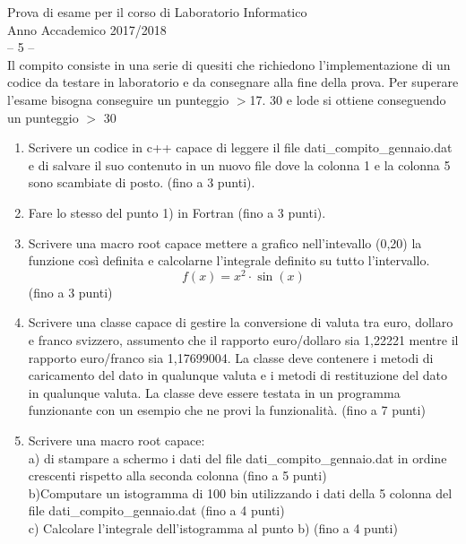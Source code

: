 \documentclass[11pt,fleqn]{book} %
\begin{document}
\newpage
\thispagestyle{empty}
{
\Large\centering
Prova di esame per il corso di Laboratorio Informatico\\		
Anno Accademico 2017/2018\\
-- 5 --\\
}
{
\small\centering
Il compito consiste in una serie di quesiti che richiedono l’implementazione di un codice da testare in laboratorio e da consegnare alla fine della prova. Per superare l’esame bisogna conseguire un punteggio $>$17.  
30 e lode si ottiene conseguendo un punteggio $>$ 30
}

\begin{enumerate}


\item Scrivere un codice in c++ capace di leggere il file dati\_compito\_gennaio.dat e di salvare il suo contenuto in un nuovo file dove la colonna 1 e la colonna 5 sono scambiate di posto. (fino a 3 punti).

\item Fare lo stesso del punto 1) in Fortran (fino a 3 punti).


\item Scrivere una macro root capace mettere a grafico nell'intevallo (0,20)
la funzione così definita e calcolarne l'integrale definito su tutto l'intervallo.
$$
f(x) = x^2\cdot\sin(x)
$$
 (fino a 3  punti)

\item Scrivere una classe capace di gestire la conversione di valuta tra euro, dollaro e franco svizzero, assumento che il rapporto euro/dollaro sia 1,22221 mentre il rapporto euro/franco sia 1,17699004. La classe deve contenere i metodi di caricamento del dato in qualunque valuta e i metodi di restituzione del dato in qualunque valuta. La classe deve essere testata in un programma funzionante con un esempio che ne provi la funzionalità. (fino a 7 punti)  

\item Scrivere una macro root capace:\\
     a) di stampare a schermo i dati del file dati\_compito\_gennaio.dat in ordine crescenti rispetto alla seconda colonna (fino a 5 punti) \\
     b)Computare un istogramma di 100 bin utilizzando i dati della 5 colonna del file  dati\_compito\_gennaio.dat  (fino a 4 punti)\\
     c) Calcolare l'integrale dell'istogramma al punto b) (fino a 4 punti)




\end{enumerate}
\end{document}
